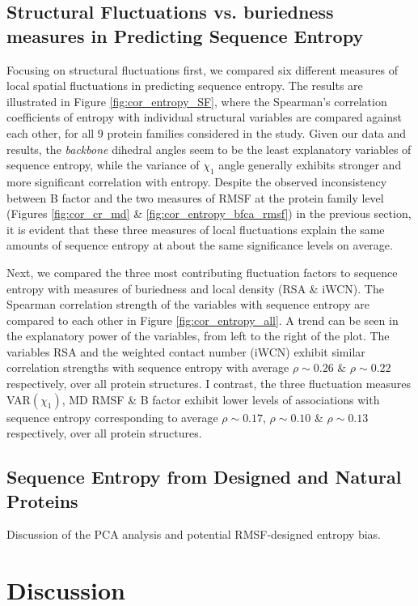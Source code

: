 \documentclass[12pt]{article}
\begin{document}
\subsection*{Structural Fluctuations vs. buriedness measures in Predicting Sequence Entropy}

Focusing on structural fluctuations first, we compared six different measures of local spatial fluctuations in predicting sequence entropy. The results are illustrated in Figure \ref{fig:cor_entropy_SF}, where the Spearman's correlation coefficients of entropy with individual structural variables are compared against each other, for all $9$ protein families considered in the study. Given our data and results, the {\it backbone} dihedral angles seem to be the least explanatory variables of sequence entropy, while the variance of $\chi_1$ angle generally exhibits stronger and more significant correlation with entropy. Despite the observed inconsistency between B factor and the two measures of RMSF at the protein family level (Figures \ref{fig:cor_cr_md} \& \ref{fig:cor_entropy_bfca_rmsf}) in the previous section, it is evident that these three measures of local fluctuations explain the same amounts of sequence entropy at about the same significance levels on average.

Next, we compared the three most contributing fluctuation factors to sequence entropy with measures of buriedness and local density (RSA \& iWCN). The Spearman correlation strength of the variables with sequence entropy are compared to each other in Figure \ref{fig:cor_entropy_all}. A trend can be seen in the explanatory power of the variables, from left to the right of the plot. The variables RSA and the weighted contact number (iWCN) exhibit similar correlation strengths with sequence entropy with average $\rho\sim0.26$ \& $\rho\sim0.22$ respectively, over all protein structures. I contrast, the three fluctuation measures VAR$(\chi_1)$, MD RMSF \& B factor exhibit lower levels of associations with sequence entropy corresponding to average $\rho\sim0.17$, $\rho\sim0.10$ \& $\rho\sim0.13$ respectively, over all protein structures.

\subsection*{Sequence Entropy from Designed and Natural Proteins}

            Discussion of the PCA analysis and potential RMSF-designed entropy bias.
	
    	
\section*{Discussion}
\end{document}
